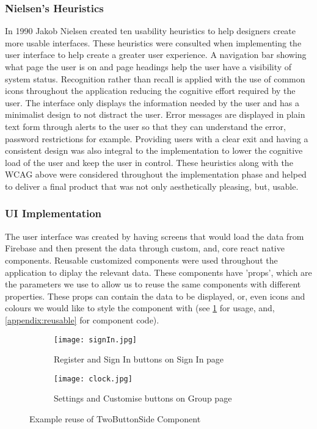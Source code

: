 \subsubsection{Nielsen's Heuristics }
In 1990 Jakob Nielsen created ten usability heuristics \cite{nielsen} to help designers create more usable interfaces. These heuristics were consulted when implementing the user interface to help create a greater user experience. A navigation bar showing what page the user is on and page headings help the user have a visibility of system status. Recognition rather than recall is applied with the use of common icons throughout the application reducing the cognitive effort required by the user. The interface only displays the information needed by the user and has a minimalist design to not distract the user. Error messages are displayed in plain text form through alerts to the user so that they can understand the error, password restrictions for example. Providing users with a clear exit and having a consistent design was also integral to the implementation to lower the cognitive load of the user and keep the user in control. These heuristics along with the WCAG above were considered throughout the implementation phase and helped to deliver a final product that was not only aesthetically pleasing, but, usable.

\subsubsection{UI Implementation}
The user interface was created by having screens that would load the data from Firebase and then present the data through custom, and, core react native components. Reusable customized components were used throughout the application to diplay the relevant data. These components have 'props', which are the parameters we use to allow us to reuse the same components with different properties. These props can contain the data to be displayed, or, even icons and colours we would like to style the component with (see \ref{fig:reuseComp} for usage, and, \ref{appendix:reusable} for component code).


\begin{figure}[!htbp]
    \centering
    \begin{subfigure}[b]{0.25\textwidth}
        \texttt{[image: signIn.jpg]}
        \caption{Register and Sign In buttons on Sign In page}
    \end{subfigure}
    \hspace{1.5em}
    \begin{subfigure}[b]{0.25\textwidth}
        \texttt{[image: clock.jpg]}
        \caption{Settings and Customise buttons on Group page}
    \end{subfigure}
    \caption{Example reuse of TwoButtonSide Component}
    \label{fig:reuseComp}
\end{figure}
\FloatBarrier
